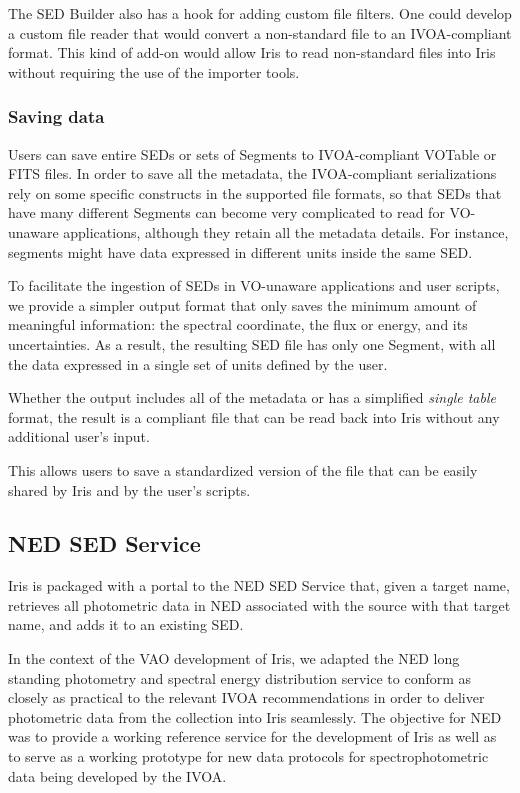 \documentclass[preprint,authoryear,5p]{elsarticle}
\begin{document}
The SED Builder also has a hook for adding custom file filters. One could develop
a custom file reader that would convert a non-standard file to an IVOA-compliant
format. This kind of add-on would allow Iris to read non-standard
files into Iris without requiring the use of the importer tools.

\subsubsection{Saving data} Users can save entire SEDs or sets of Segments to
IVOA-compliant VOTable or FITS files. In order to save all the metadata, the
IVOA-compliant serializations rely on some specific constructs in the supported
file formats, so that SEDs that have many different Segments can become very
complicated to read for VO-unaware applications, although they retain all the
metadata details. For instance, segments might have data expressed in different
units inside the same SED.

To facilitate the ingestion of SEDs in VO-unaware applications and user scripts,
we provide a simpler output format that only saves the minimum amount of
meaningful information: the spectral coordinate, the flux or energy, and its
uncertainties. As a result, the resulting SED file has only
one Segment, with all the data expressed in a single set of units defined by the user.

Whether the output includes all of the metadata or has a simplified \emph{single
table} format, the result is a compliant file that can be read back into Iris
without any additional user's input.

This allows users to save a standardized version of the file that can be easily
shared by Iris and by the user's scripts.

\subsection{NED SED Service} \label{subsec:ned}

Iris is packaged with a portal to the NED SED
Service that, given a target name,
retrieves all photometric data in NED associated with the source with that target
name, and adds it to an existing SED.

In the context of the VAO development of Iris, we adapted the NED long standing photometry and spectral energy
distribution service to conform as closely as practical to the relevant
IVOA recommendations in order to deliver photometric data from the
collection into Iris seamlessly. The objective for NED was to provide a working reference
service for the development of Iris as well as to serve as a working prototype
for new data protocols for spectrophotometric data being developed by the IVOA.
\end{document}

